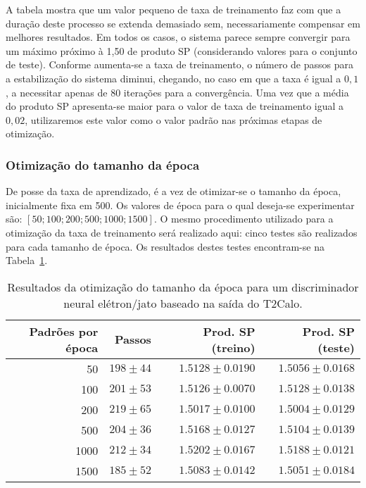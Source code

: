 A tabela mostra que um valor pequeno de taxa de treinamento faz com que a
duração deste processo se extenda demasiado sem, necessariamente compensar em
melhores resultados. Em todos os casos, o sistema parece sempre convergir para
um máximo próximo à 1,50 de produto SP (considerando valores para o conjunto
de teste). Conforme aumenta-se a taxa de treinamento, o número de passos para
a estabilização do sistema diminui, chegando, no caso em que a taxa é igual a
$0,1$, a necessitar apenas de 80 iterações para a convergência. Uma vez que a
média do produto SP apresenta-se maior para o valor de taxa de treinamento
igual a $0,02$, utilizaremos este valor como o valor padrão nas próximas
etapas de otimização.

\subsubsection{Otimização do tamanho da época}

De posse da taxa de aprendizado, é a vez de otimizar-se o tamanho da época,
inicialmente fixa em 500. Os valores de época para o qual deseja-se
experimentar são: $[50; 100; 200; 500; 1000; 1500]$. O mesmo procedimento
utilizado para a otimização da taxa de treinamento será realizado aqui: cinco
testes são realizados para cada tamanho de época. Os resultados destes testes
encontram-se na Tabela~\ref{tab:t2calo-neural-epoch-scan}.

\begin{table}
\caption{Resultados da otimização do tamanho da época para um discriminador
neural elétron/jato baseado na saída do T2Calo.}
\label{tab:t2calo-neural-epoch-scan}
\begin{center}
\begin{tabular}{|r|r|r|r|} \hline
Padrões por época & Passos & Prod. SP (treino) & Prod. SP (teste) \\
\hline 
50 & $198\pm44$ & $1.5128\pm0.0190$ & $1.5056\pm0.0168$ \\ \hline
100 & $201\pm53$ & $1.5126\pm0.0070$ & $1.5128\pm0.0138$ \\ \hline
200 & $219\pm65$ & $1.5017\pm0.0100$ & $1.5004\pm0.0129$ \\ \hline
500 & $204\pm36$ & $1.5168\pm0.0127$ & $1.5104\pm0.0139$ \\ \hline
1000 & $212\pm34$ & $1.5202\pm0.0167$ & $1.5188\pm0.0121$ \\ \hline
1500 & $185\pm52$ & $1.5083\pm0.0142$ & $1.5051\pm0.0184$ \\ \hline
\end{tabular}
\end{center}
\end{table}

